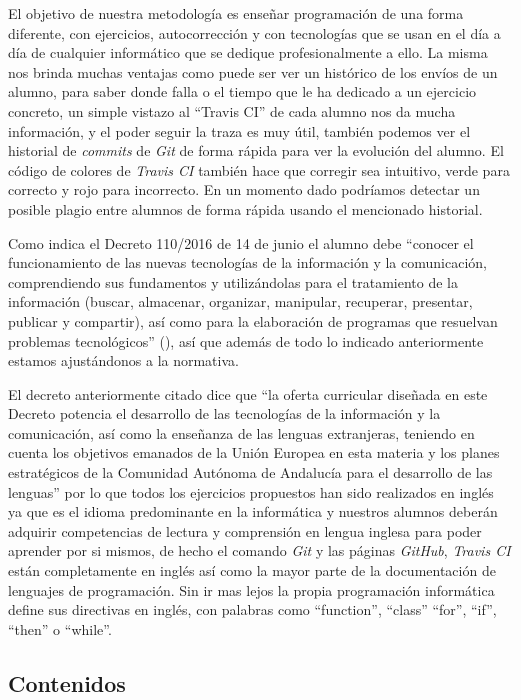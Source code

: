 \bigskip
El objetivo de nuestra metodología es enseñar programación de una forma diferente, con ejercicios, autocorrección y con tecnologías que se usan en el día a día de cualquier informático que se dedique profesionalmente a ello. La misma nos brinda muchas ventajas como puede ser ver un histórico de los envíos de un alumno, para saber donde falla o el tiempo que le ha dedicado a un ejercicio concreto, un simple vistazo al ``Travis CI'' de cada alumno nos da mucha información, y el poder seguir la traza es muy útil, también podemos ver el historial de \textit{commits} de \textit{Git} de forma rápida para ver la evolución del alumno. El código de colores de \textit{Travis CI} también hace que corregir sea intuitivo, verde para correcto y rojo para incorrecto. En un momento dado podríamos detectar un posible plagio entre alumnos de forma rápida usando el mencionado historial.

\bigskip
Como indica el Decreto 110/2016  de 14 de junio el alumno debe ``conocer el funcionamiento de las nuevas tecnologías de la información y la comunicación, comprendiendo sus fundamentos y utilizándolas para el tratamiento de la información (buscar, almacenar, organizar, manipular, recuperar, presentar, publicar y compartir), así como para la elaboración de programas que resuelvan problemas tecnológicos'' (\cite{junta_de_andalucia_decreto_2016}), así que además de todo lo indicado anteriormente estamos ajustándonos a la normativa.

\bigskip
El decreto anteriormente citado dice que ``la oferta curricular diseñada en este Decreto potencia el desarrollo de las tecnologías de la información y la comunicación, así como la enseñanza de las lenguas extranjeras, teniendo en cuenta los objetivos emanados de la Unión Europea en esta materia y los planes estratégicos de la Comunidad Autónoma de Andalucía para el desarrollo de las lenguas'' por lo que todos los ejercicios propuestos han sido realizados en inglés ya que es el idioma predominante en la informática y nuestros alumnos deberán adquirir competencias de lectura y comprensión en lengua inglesa para poder aprender por si mismos, de hecho el comando \textit{Git} y las páginas \textit{GitHub}, \textit{Travis CI} están completamente en inglés así como la mayor parte de la documentación de lenguajes de programación. Sin ir mas lejos la propia programación informática define sus directivas en inglés, con palabras como ``function'', ``class'' ``for'', ``if'', ``then'' o ``while''.

\subsection{Contenidos}

